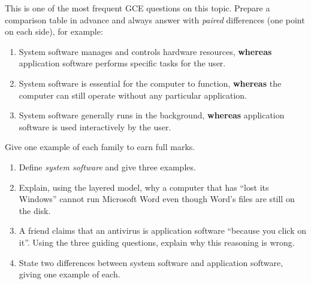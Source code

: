 \documentclass[11pt]{article}
\begin{document}
\begin{methode}
This is one of the most frequent GCE questions on this topic. Prepare a comparison table in advance and always answer with \emph{paired} differences (one point on each side), for example:
\begin{enumerate}
\item System software manages and controls hardware resources, \textbf{whereas} application software performs specific tasks for the user.
\item System software is essential for the computer to function, \textbf{whereas} the computer can still operate without any particular application.
\item System software generally runs in the background, \textbf{whereas} application software is used interactively by the user.
\end{enumerate}
Give one example of each family to earn full marks.
\end{methode}

\begin{exercice}
\begin{enumerate}
\item Define \emph{system software} and give three examples.
\item Explain, using the layered model, why a computer that has ``lost its Windows'' cannot run Microsoft Word even though Word's files are still on the disk.
\item A friend claims that an antivirus is application software ``because you click on it''. Using the three guiding questions, explain why this reasoning is wrong.
\item State two differences between system software and application software, giving one example of each.
\end{enumerate}
\end{exercice}
\end{document}
